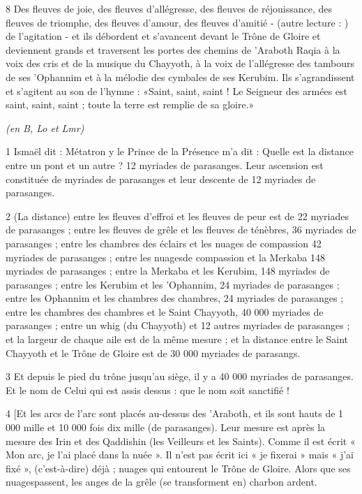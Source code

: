 \par 8 Des fleuves de joie, des fleuves d'allégresse, des fleuves de réjouissance, des fleuves de triomphe, des fleuves d'amour, des fleuves d'amitié - (autre lecture : ) de l'agitation - et ils débordent et s'avancent devant le Trône de Gloire et deviennent grands et traversent les portes des chemins de 'Araboth Raqia à la voix des cris et de la musique du Chayyoth, à la voix de l'allégresse des tambours de ses 'Ophannim et à la mélodie des cymbales de ses Kerubim. Ils s'agrandissent et s'agitent au son de l'hymne : «Saint, saint, saint ! Le Seigneur des armées est saint, saint, saint ; toute la terre est remplie de sa gloire.»


\par \textit{(en B, Lo et Lmr)}

\par 1 Ismaël dit : Métatron y le Prince de la Présence m'a dit : Quelle est la distance entre un pont et un autre ? 12 myriades de parasanges. Leur ascension est constituée de myriades de parasanges et leur descente de 12 myriades de parasanges.

\par 2 (La distance) entre les fleuves d'effroi et les fleuves de peur est de 22 myriades de parasanges ; entre les fleuves de grêle et les fleuves de ténèbres, 36 myriades de parasanges ; entre les chambres des éclairs et les nuages ​​de compassion 42 myriades de parasanges ; entre les nuages ​​de compassion et la Merkaba 148 myriades de parasanges ; entre la Merkaba et les Kerubim, 148 myriades de parasanges ; entre les Kerubim et les 'Ophannim, 24 myriades de parasanges ; entre les Ophannim et les chambres des chambres, 24 myriades de parasanges ; entre les chambres des chambres et le Saint Chayyoth, 40 000 myriades de parasanges ; entre un whig (du Chayyoth) et 12 autres myriades de parasanges ; et la largeur de chaque aile est de la même mesure ; et la distance entre le Saint Chayyoth et le Trône de Gloire est de 30 000 myriades de parasangs.

\par 3 Et depuis le pied du trône jusqu'au siège, il y a 40 000 myriades de parasanges. Et le nom de Celui qui est assis dessus : que le nom soit sanctifié !

\par 4 [Et les arcs de l'arc sont placés au-dessus des 'Araboth, et ils sont hauts de 1 000 mille et 10 000 fois dix mille (de parasanges). Leur mesure est après la mesure des Irin et des Qaddishin (les Veilleurs et les Saints). Comme il est écrit « Mon arc, je l'ai placé dans la nuée ». Il n'est pas écrit ici « je fixerai » mais « j'ai fixé », (c'est-à-dire) déjà ; nuages ​​qui entourent le Trône de Gloire. Alors que ses nuages ​​passent, les anges de la grêle (se transforment en) charbon ardent.

